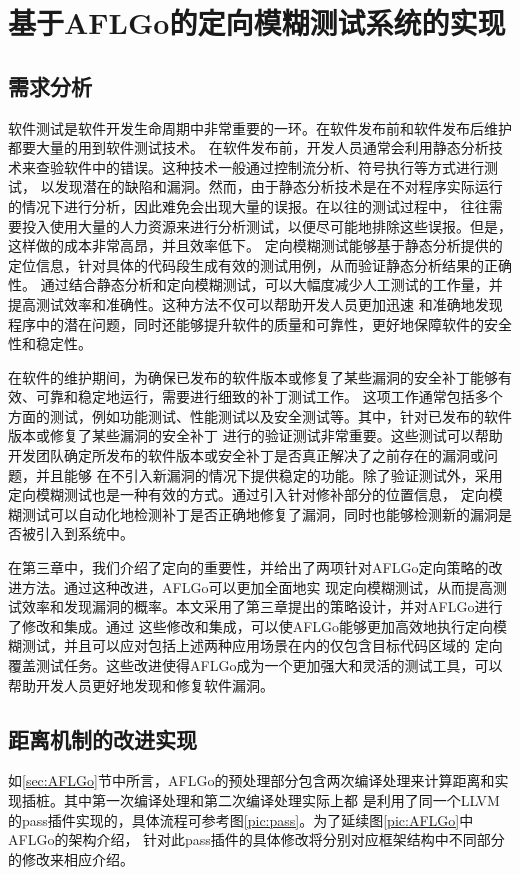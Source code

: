\documentclass[bachelor]{njupthesis}
\begin{document}
\chapter{基于AFLGo的定向模糊测试系统的实现}
\section{需求分析}
软件测试是软件开发生命周期中非常重要的一环。在软件发布前和软件发布后维护都要大量的用到软件测试技术。
在软件发布前，开发人员通常会利用静态分析技术来查验软件中的错误。这种技术一般通过控制流分析、符号执行等方式进行测试，
以发现潜在的缺陷和漏洞。然而，由于静态分析技术是在不对程序实际运行的情况下进行分析，因此难免会出现大量的误报。在以往的测试过程中，
往往需要投入使用大量的人力资源来进行分析测试，以便尽可能地排除这些误报。但是，这样做的成本非常高昂，并且效率低下。
定向模糊测试能够基于静态分析提供的定位信息，针对具体的代码段生成有效的测试用例，从而验证静态分析结果的正确性。
通过结合静态分析和定向模糊测试，可以大幅度减少人工测试的工作量，并提高测试效率和准确性。这种方法不仅可以帮助开发人员更加迅速
和准确地发现程序中的潜在问题，同时还能够提升软件的质量和可靠性，更好地保障软件的安全性和稳定性。

在软件的维护期间，为确保已发布的软件版本或修复了某些漏洞的安全补丁能够有效、可靠和稳定地运行，需要进行细致的补丁测试工作。
这项工作通常包括多个方面的测试，例如功能测试、性能测试以及安全测试等。其中，针对已发布的软件版本或修复了某些漏洞的安全补丁
进行的验证测试非常重要。这些测试可以帮助开发团队确定所发布的软件版本或安全补丁是否真正解决了之前存在的漏洞或问题，并且能够
在不引入新漏洞的情况下提供稳定的功能。除了验证测试外，采用定向模糊测试也是一种有效的方式。通过引入针对修补部分的位置信息，
定向模糊测试可以自动化地检测补丁是否正确地修复了漏洞，同时也能够检测新的漏洞是否被引入到系统中。

在第三章中，我们介绍了定向的重要性，并给出了两项针对AFLGo定向策略的改进方法。通过这种改进，AFLGo可以更加全面地实
现定向模糊测试，从而提高测试效率和发现漏洞的概率。本文采用了第三章提出的策略设计，并对AFLGo进行了修改和集成。通过
这些修改和集成，可以使AFLGo能够更加高效地执行定向模糊测试，并且可以应对包括上述两种应用场景在内的仅包含目标代码区域的
定向覆盖测试任务。这些改进使得AFLGo成为一个更加强大和灵活的测试工具，可以帮助开发人员更好地发现和修复软件漏洞。

\section{距离机制的改进实现}
如\ref{sec:AFLGo}节中所言，AFLGo的预处理部分包含两次编译处理来计算距离和实现插桩。其中第一次编译处理和第二次编译处理实际上都
是利用了同一个LLVM的pass插件\cite{Pass}实现的，具体流程可参考图\ref{pic:pass}。为了延续图\ref{pic:AFLGo}中AFLGo的架构介绍，
针对此pass插件的具体修改将分别对应框架结构中不同部分的修改来相应介绍。
\end{document}
